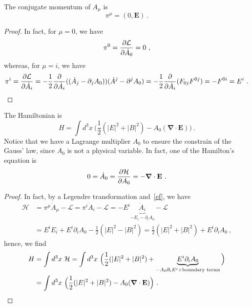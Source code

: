     The conjugate momentum of $A_\mu$ is 
    \begin{equation*}
        \pi^\mu = (0, \mathbf E) ~.
    \end{equation*}
    \begin{proof}
        In fact, for $\mu = 0$, we have
        \begin{equation*}
            \pi^0 = \frac{\partial\mathcal L}{\partial\dot A_0} = 0 ~,
        \end{equation*}
        whereas, for $\mu = i$, we have
        \begin{equation*}
        \begin{aligned}
            \pi^i = \frac{\partial\mathcal L}{\partial\dot A_i} = - \frac{1}{2} \frac{\partial}{\partial\dot A_i} ((\dot A_j - \partial_j A_0))(\dot A^j - \partial^j A_0) = - \frac{1}{2} \frac{\partial}{\partial\dot A_i} (F_{0j} F^{0j}) = - F^{0i} = E^i ~.
        \end{aligned}
        \end{equation*}
    \end{proof}

    The Hamiltonian is 
    \begin{equation*}
        H = \int d^3 x ~\Big ( \frac{1}{2}  (|E|^2 + |B|^2) - A_0 (\boldsymbol \nabla \cdot \mathbf E) \Big) ~.
    \end{equation*}
    Notice that we have a Lagrange multiplier $A_0$ to ensure the constrain of the Gauss' law, since $A_0$ is not a physical variable. In fact, one of the Hamilton's equation is
    \begin{equation*}
        0 = \dot A_0 = \frac{\partial\mathcal H}{\partial A_0} = - \boldsymbol \nabla \cdot \mathbf E ~. 
    \end{equation*}
    \begin{proof}
        In fact, by a Legendre transformation and~\eqref{ef}, we have
        \begin{equation*}
        \begin{aligned}
            \mathcal H & = \pi^\mu \dot A_\mu - \mathcal L = \pi^i \dot A_i - \mathcal L = - E^i \underbrace{\dot A_i}_{- E_i - \partial_i A_0} - \mathcal L \\ & = E^i E_i + E^i \partial_i A_0 - \frac{1}{2} (|E|^2 - |B|^2) = \frac{1}{2} (|E|^2 + |B|^2) + E^i \partial_i A_0 ~,
        \end{aligned}
        \end{equation*}
        hence, we find
        \begin{equation}
        \begin{aligned}
            H & = \int d^3 x ~ \mathcal H = \int d^3 x ~ \Big ( \frac{1}{2} (|E|^2 + |B|^2) + \underbrace{E^i \partial_i A_0}_{- A_0 \partial_i E^i + \textnormal{boundary terms}} \Big) \\ & = \int d^3 x ~ \Big ( \frac{1}{2} (|E|^2 + |B|^2) - A_0 (\boldsymbol \nabla \cdot \mathbf E) \Big) ~.
        \end{aligned}
        \end{equation}
    \end{proof}

